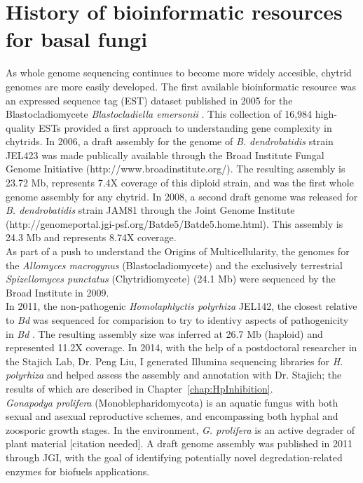 \section{History of bioinformatic resources for basal fungi}
As whole genome sequencing continues to become more widely accesible, chytrid genomes are more easily developed. The first available bioinformatic resource was an expressed sequence tag (EST) dataset published in 2005 for the Blastocladiomycete \textit{Blastocladiella emersonii} \cite{Ribichich2005}. This collection of 16,984 high-quality ESTs provided a first approach to understanding gene complexity in chytrids. In 2006, a draft assembly for the genome of \textit{B. dendrobatidis} strain JEL423 was made publically available through the Broad Institute Fungal Genome Initiative (http://www.broadinstitute.org/). The resulting assembly is 23.72 Mb, represents 7.4X coverage of this diploid strain, and was the first whole genome assembly for any chytrid. In 2008, a second draft genome was released for \textit{B. dendrobatidis} strain JAM81 through the Joint Genome Institute (http://genomeportal.jgi-psf.org/Batde5/Batde5.home.html). This assembly is 24.3 Mb and represents 8.74X coverage. \\
\indent As part of a push to understand the Origins of Multicellularity, the genomes for the \textit{Allomyces macrogynus} (Blastocladiomycete) and the exclusively terrestrial \textit{Spizellomyces punctatus} (Chytridiomycete) (24.1 Mb) were sequenced by the Broad Institute in 2009. \\
\indent In 2011, the non-pathogenic \textit{Homolaphlyctis polyrhiza} JEL142, the closest relative to \textit{Bd} was sequenced for comparision to try to identivy aspects of pathogenicity in \textit{Bd} \cite{Joneson2011}. The resulting assembly size was inferred at 26.7 Mb (haploid) and represented 11.2X coverage. In 2014, with the help of a postdoctoral researcher in the Stajich Lab, Dr. Peng Liu, I generated Illumina sequencing libraries for \textit{H. polyrhiza} and helped assess the assembly and annotation with Dr. Stajich; the results of which are described in Chapter~\ref{chap:HpInhibition}.\\
\indent \textit{Gonapodya prolifera} (Monoblepharidomycota) is an aquatic fungus with both sexual and asexual reproductive schemes, and encompassing both hyphal and zoosporic growth stages. In the environment, \textit{G. prolifera} is an active degrader of plant material [citation needed]. A draft genome assembly was published in 2011 through JGI, with the goal of identifying potentially novel degredation-related enzymes for biofuels applications.\\
